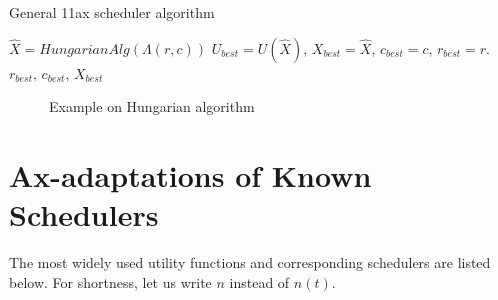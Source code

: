 \begin{algorithm}
	\caption{General 11ax scheduler algorithm}\label{alg:11ax}
	\begin{algorithmic}[1]
		\State $\hat X = HungarianAlg(\Lambda(r, c))$
		\State $U_{best} = U(\hat X)$,
		\State $X_{best} = \hat X$,
		\State $c_{best} = c$,
		\State $r_{best} = r$.
		\EndIf
		\EndFor
		\EndFor
		\State \Return $r_{best}$, $c_{best}$, $X_{best}$
		\EndProcedure
	\end{algorithmic}
\end{algorithm}

\begin{figure}[t]
\centering
\caption{\label{fig:matrixexm} Example on Hungarian algorithm}
\end{figure}

\section{Ax-adaptations of Known Schedulers}
\label{sec:adaptations}

The most widely used utility functions and corresponding schedulers are listed below. For shortness, let us write $n$ instead of $n(t)$.

